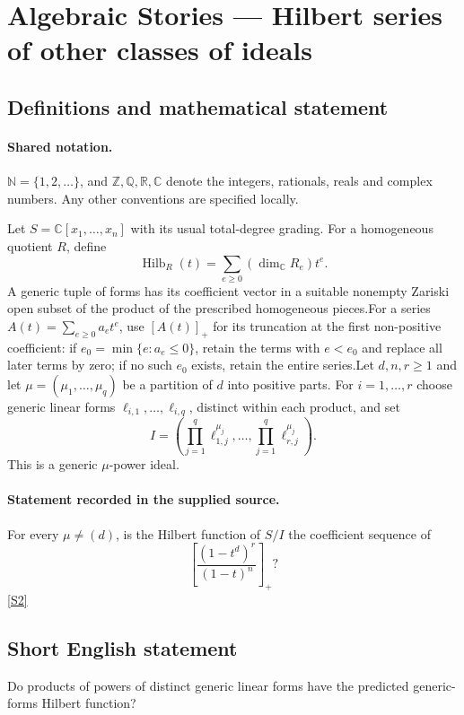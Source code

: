\documentclass[11pt]{article}
\newcommand{\sref}[2]{\hyperlink{source:#1:#2}{[S#2]}}
\begin{document}
\section{Algebraic Stories — Hilbert series of other classes of ideals}\label{statement}

\subsection{Definitions and mathematical statement}

\paragraph{Shared notation.}$\mathbb N=\{1,2,\ldots\}$, and $\mathbb Z,\mathbb Q,\mathbb R,\mathbb C$ denote the integers, rationals, reals and complex numbers. Any other conventions are specified locally.


Let $S=\mathbb C[x_1,\ldots,x_n]$ with its usual total-degree grading. For a homogeneous quotient $R$, define
\[\operatorname{Hilb}_R(t)=\sum_{e\geq0}(\dim_{\mathbb C}R_e)t^e.
\]
A generic tuple of forms has its coefficient vector in a suitable nonempty Zariski open subset of the product of the prescribed homogeneous pieces.For a series $A(t)=\sum_{e\geq0}a_et^e$, use $[A(t)]_+$ for its truncation at the first non-positive coefficient: if $e_0=\min\{e:a_e\leq0\}$, retain the terms with $e<e_0$ and replace all later terms by zero; if no such $e_0$ exists, retain the entire series.Let $d,n,r\geq1$ and let $\mu=(\mu_1,\ldots,\mu_q)$ be a partition of $d$ into positive parts. For $i=1,\ldots,r$ choose generic linear forms $\ell_{i,1},\ldots,\ell_{i,q}$, distinct within each product, and set
\[I=\left(\prod_{j=1}^q\ell_{1,j}^{\mu_j},\ldots,\prod_{j=1}^q\ell_{r,j}^{\mu_j}\right).
\]
This is a generic $\mu$-power ideal.
\paragraph{Statement recorded in the supplied source.}
For every $\mu\neq(d)$, is the Hilbert function of $S/I$ the coefficient sequence of
\[\left[\frac{(1-t^d)^r}{(1-t)^n}\right]_+?\] \sref{statement}{2}
\subsection{Short English statement}
Do products of powers of distinct generic linear forms have the predicted generic-forms Hilbert function?
\end{document}

